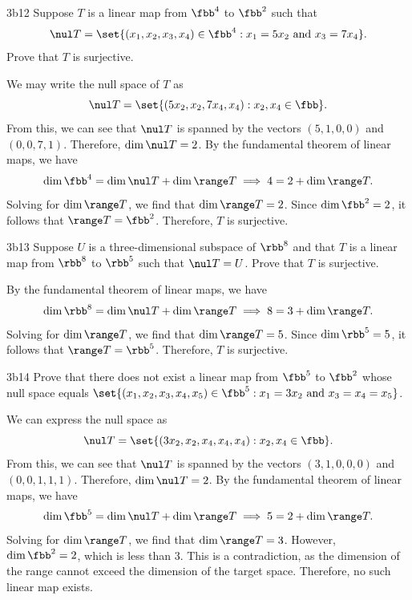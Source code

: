 \begin{exercise}{3b12}
    Suppose $T$ is a linear map from $\fbb^4$ to $\fbb^2$ such that
    \[
    	\nul T = \set{(x_1, x_2, x_3, x_4) \in \fbb^4 : x_1 = 5x_2 \text{ and } x_3 = 7x_4}.
    \]
    Prove that $T$ is surjective.
\end{exercise}

\begin{sol}
    We may write the null space of $T$ as
    \[
    	\nul T = \set{(5x_2, x_2, 7x_4, x_4) : x_2, x_4 \in \fbb}.
    \]
    From this, we can see that $\nul T$ is spanned by the vectors $(5, 1, 0, 0)$ and $(0, 0, 7, 1)$.
	Therefore, $\dim \nul T = 2$.
	By the fundamental theorem of linear maps, we have
    \[
    	\dim \fbb^4 = \dim \nul T + \dim \range T \implies 4 = 2 + \dim \range T.
    \]
    Solving for $\dim \range T$, we find that $\dim \range T = 2$.
	Since $\dim \fbb^2 = 2$, it follows that $\range T = \fbb^2$.
	Therefore, $T$ is surjective.
\end{sol}

\begin{exercise}{3b13}
    Suppose $U$ is a three-dimensional subspace of $\rbb^8$ and that $T$ is a linear map from $\rbb^8$ to $\rbb^5$ such that $\nul T = U$.
	Prove that $T$ is surjective.
\end{exercise}

\begin{sol}
    By the fundamental theorem of linear maps, we have
    \[
    	\dim \rbb^8 = \dim \nul T + \dim \range T \implies 8 = 3 + \dim \range T.
    \]
    Solving for $\dim \range T$, we find that $\dim \range T = 5$.
	Since $\dim \rbb^5 = 5$, it follows that $\range T = \rbb^5$.
	Therefore, $T$ is surjective.
\end{sol}

\begin{exercise}{3b14}
    Prove that there does not exist a linear map from $\fbb^5$ to $\fbb^2$ whose null space equals $\set{(x_1, x_2, x_3, x_4, x_5) \in \fbb^5 : x_1 = 3x_2 \text{ and } x_3 = x_4 = x_5}$.
\end{exercise}

\begin{sol}
    We can express the null space as
    \[
    	\nul T = \set{(3x_2, x_2, x_4, x_4, x_4) : x_2, x_4 \in \fbb}.
    \]
    From this, we can see that $\nul T$ is spanned by the vectors $(3, 1, 0, 0, 0)$ and $(0, 0, 1, 1, 1)$.
	Therefore, $\dim \nul T = 2$.
	By the fundamental theorem of linear maps, we have
    \[
    	\dim \fbb^5 = \dim \nul T + \dim \range T \implies 5 = 2 + \dim \range T.
    \]
    Solving for $\dim \range T$, we find that $\dim \range T = 3$.
	However, $\dim \fbb^2 = 2$, which is less than $3$.
	This is a contradiction, as the dimension of the range cannot exceed the dimension of the target space.
	Therefore, no such linear map exists.
\end{sol}

